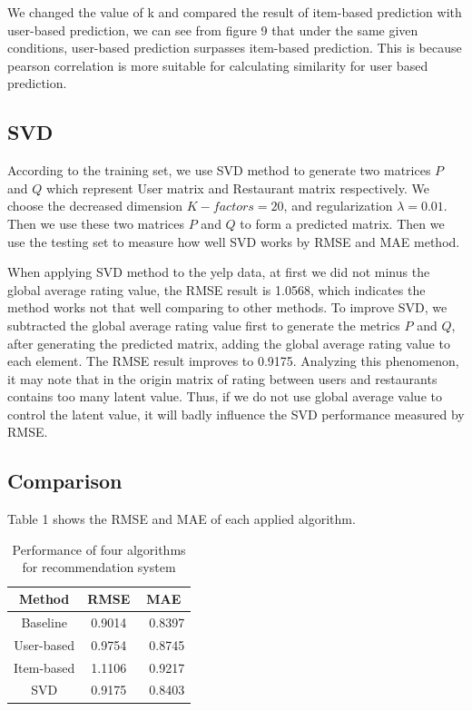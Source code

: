\documentclass{llncs}
\begin{document}
We changed the value of k and compared the result of item-based prediction with user-based prediction, we can see from figure 9 that under the same given conditions, user-based prediction surpasses item-based prediction. This is because pearson correlation is more suitable for calculating similarity for user based prediction. 

\subsection{SVD}
According to the training set, we use SVD method to generate two matrices $P$ and $Q$ which represent User matrix and Restaurant matrix respectively. We choose the decreased dimension $K-factors = 20$, and regularization $\lambda = 0.01$. Then we use these two matrices $P$ and $Q$ to form a predicted matrix. Then we use the testing set to measure how well SVD works by RMSE and MAE method.

When applying SVD method to the yelp data, at first we did not minus the global average rating value, the RMSE result is 1.0568, which indicates the method works not that well comparing to other methods. To improve SVD, we subtracted the global average rating value first to generate the metrics $P$ and $Q$, after generating the predicted matrix, adding the global average rating value to each element. The RMSE result improves to  0.9175. Analyzing this phenomenon, it may note that in the origin matrix of rating between users and restaurants contains too many latent value. Thus, if we do not use global average value to control the latent value, it will badly influence the SVD performance measured by RMSE.

\subsection{Comparison}
Table 1 shows the RMSE and MAE of each applied algorithm.
\begin{table}
	\caption{Performance of four algorithms for recommendation system}
	\begin{center}
		\begin{tabular}{ccc}
			\hline
				\rule{0pt}{12pt}Method  & \rule{0pt}{12pt}RMSE   &\rule{0pt}{12pt} MAE\\
			\hline\rule{0pt}{12pt}
			Baseline    &   0.9014 & \ 	0.8397 \\
			User-based  &   0.9754 & \ 	0.8745\\
			Item-based  &   1.1106 & \      0.9217\\
			SVD         &   0.9175 & \      0.8403\\
			\hline
		\end{tabular}
	\end{center}
\end{table}
\end{document}
